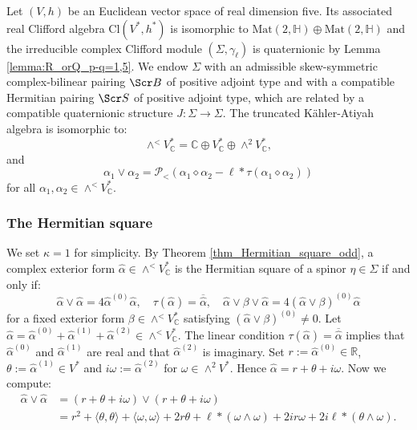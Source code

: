 \documentclass[10pt,a4paper,twoside,reqno]{amsart}
\theoremstyle{plain}
\theoremstyle{definition}
\theoremstyle{remark}
\newcommand{\Mat}{\mathrm{Mat}}
\def\C{\mathbb{C}}
\def\R{\mathbb{R}}
\def\scB{\Scr B}
\def\scS{\Scr S}
\def\Cl{\mathrm{Cl}}
\def\cP{\mathcal{P}}
\def\cP{\mathcal{P}}
\def\R{\mathbb{R}}
\newcommand{\escal}[1]{\langle#1\rangle}
\begin{document}

Let $(V,h)$ be an Euclidean vector space of real dimension five. Its associated real Clifford algebra $\Cl(V^*,h^*)$ is isomorphic to $\Mat(2,\mathbb{H})\oplus\Mat(2,\mathbb{H})$ and the irreducible complex Clifford module $(\Sigma,\gamma_\ell)$ is quaternionic by Lemma \ref{lemma:R_orQ_p-q=1,5}. We endow $\Sigma$ with an admissible skew-symmetric complex-bilinear pairing $\scB$ of positive adjoint type and with a compatible Hermitian pairing $\scS$ of positive adjoint type, which are related by a compatible quaternionic structure $J\colon\Sigma\to\Sigma$. The truncated Kähler-Atiyah algebra is isomorphic to: $$\wedge^<V^*_\C=\C\oplus V^*_\C\oplus\wedge^2V^*_\C,$$
and $$\alpha_1\vee\alpha_2=\cP_<(\alpha_1\diamond\alpha_2-\ell*\tau(\alpha_1\diamond\alpha_2))$$ for all $\alpha_1,\alpha_2\in\wedge^<V^*_\C$.


\subsubsection{The Hermitian square}


We set $\kappa=1$ for simplicity. By Theorem \ref{thm_Hermitian_square_odd}, a complex exterior form $\widehat{\alpha}\in\wedge^<V^*_\C$ is the Hermitian square of a spinor $\eta\in\Sigma$ if and only if: $$\widehat{\alpha}\vee\widehat{\alpha}=4\widehat{\alpha}^{(0)}\widehat{\alpha},\quad\tau(\widehat{\alpha})=\overline{\widehat{\alpha}},\quad\widehat{\alpha}\vee\beta\vee\widehat{\alpha}=4(\widehat{\alpha}\vee\beta)^{(0)}\widehat{\alpha}$$ for a fixed exterior form $\beta\in\wedge^<V^*_\C$ satisfying $(\widehat{\alpha}\vee\beta)^{(0)}\neq0$. Let $\widehat{\alpha}=\widehat{\alpha}^{(0)}+\widehat{\alpha}^{(1)}+\widehat{\alpha}^{(2)}\in\wedge^<V^*_\C$. The linear condition $\tau(\widehat{\alpha})=\overline{\widehat{\alpha}}$ implies that $\widehat{\alpha}^{(0)}$ and $\widehat{\alpha}^{(1)}$ are real and that $\widehat{\alpha}^{(2)}$ is imaginary. Set $r:=\widehat{\alpha}^{(0)}\in\R$, $\theta:=\widehat{\alpha}^{(1)}\in V^*$ and $i\omega:=\widehat{\alpha}^{(2)}$ for $\omega\in\wedge^2V^*$. Hence $\widehat{\alpha}=r+\theta+i\omega$. Now we compute:
\begin{align*}
\widehat{\alpha}\vee\widehat{\alpha}&=(r+\theta+i\omega)\vee(r+\theta+i\omega)\\
&=r^2+\escal{\theta,\theta}+\escal{\omega,\omega}+2r\theta+\ell*(\omega\wedge\omega)+2ir\omega+2i\ell*(\theta\wedge\omega).
\end{align*}
\end{document}
